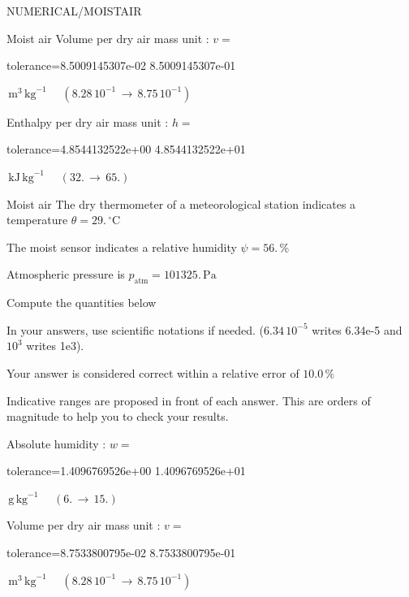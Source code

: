 \documentclass[12pt]{article}
\begin{document}
\begin{quiz}{NUMERICAL/MOISTAIR}
\begin{cloze}{Moist air}
Volume per dry air mass unit : $v =  $
\begin{numerical}[points=1] 
\item[tolerance={8.5009145307e-02}] 8.5009145307e-01 
\end{numerical} 
 $\,  \mathrm{m}^{3}\,  \mathrm{kg}^{-1}$ 
 $ \quad ( 8.28 \, 10^{-1}  \, \rightarrow \,  8.75 \, 10^{-1} ) $ 

Enthalpy per dry air mass unit : $h =  $
\begin{numerical}[points=2] 
\item[tolerance={4.8544132522e+00}] 4.8544132522e+01 
\end{numerical} 
 $\,  \mathrm{kJ}\,  \mathrm{kg}^{-1}$ 
 $ \quad (32. \, \rightarrow \, 65.) $ 

\end{cloze} 


 \begin{cloze}{Moist air} 
The dry thermometer of a meteorological station indicates a temperature $\theta = 29.\,  \mathrm{^\circ\mathrm{C}} $

The moist sensor indicates a relative humidity $\psi = 56.\, \% $

Atmospheric pressure is $p_{\text{atm}} = 101325.\,  \mathrm{Pa} $

 

Compute the quantities below

In your answers, use scientific notations if needed.  ($6.34\, 10^{-5}$ writes 6.34e-5 and $10^{3}$ writes 1e3).

Your answer is considered correct within a relative error of $10.0\, \% $

Indicative ranges are proposed in front of each answer. This are orders of magnitude to help you to check your results.

Absolute humidity : $w =  $
\begin{numerical}[points=1] 
\item[tolerance={1.4096769526e+00}] 1.4096769526e+01 
\end{numerical} 
 $\,  \mathrm{g}\,  \mathrm{kg}^{-1}$ 
 $ \quad (6. \, \rightarrow \, 15.) $ 

Volume per dry air mass unit : $v =  $
\begin{numerical}[points=1] 
\item[tolerance={8.7533800795e-02}] 8.7533800795e-01 
\end{numerical} 
 $\,  \mathrm{m}^{3}\,  \mathrm{kg}^{-1}$ 
 $ \quad ( 8.28 \, 10^{-1}  \, \rightarrow \,  8.75 \, 10^{-1} ) $ 


\end{cloze}
\end{quiz}
\end{document}

